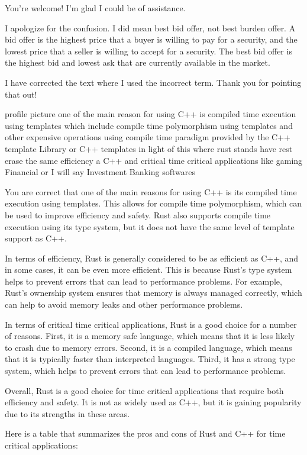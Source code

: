 \documentclass[11pt]{article}
\begin{document}
You're welcome! I'm glad I could be of assistance.

I apologize for the confusion. I did mean best bid offer, not best burden offer. A bid offer is the highest price that a buyer is willing to pay for a security, and the lowest price that a seller is willing to accept for a security. The best bid offer is the highest bid and lowest ask that are currently available in the market.

I have corrected the text where I used the incorrect term. Thank you for pointing that out!

profile picture
one of the main reason for using
C++
is compiled time execution
using templates
which include compile time polymorphism
using templates
and other
expensive
operations
using
compile time paradigm
provided by the
C++ template Library
or C++ templates
in light of this
where
rust stands
have rest
erase the same
efficiency a C++
and critical time critical applications
like gaming
Financial
or I will say Investment Banking softwares

You are correct that one of the main reasons for using C++ is its compiled time execution using templates. This allows for compile time polymorphism, which can be used to improve efficiency and safety. Rust also supports compile time execution using its type system, but it does not have the same level of template support as C++.

In terms of efficiency, Rust is generally considered to be as efficient as C++, and in some cases, it can be even more efficient. This is because Rust's type system helps to prevent errors that can lead to performance problems. For example, Rust's ownership system ensures that memory is always managed correctly, which can help to avoid memory leaks and other performance problems.

In terms of critical time critical applications, Rust is a good choice for a number of reasons. First, it is a memory safe language, which means that it is less likely to crash due to memory errors. Second, it is a compiled language, which means that it is typically faster than interpreted languages. Third, it has a strong type system, which helps to prevent errors that can lead to performance problems.

Overall, Rust is a good choice for time critical applications that require both efficiency and safety. It is not as widely used as C++, but it is gaining popularity due to its strengths in these areas.

Here is a table that summarizes the pros and cons of Rust and C++ for time critical applications:
\end{document}
